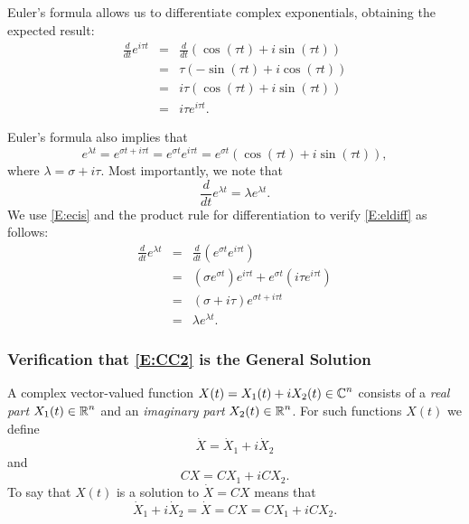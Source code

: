 \documentclass{ximera}
\begin{document}
Euler's formula allows us to differentiate
complex exponentials, obtaining the expected result:
\begin{eqnarray*}
\frac{d}{dt}e^{i\tau t} & = &
\frac{d}{dt}(\cos(\tau t) + i\sin(\tau t))\\
& = & \tau(-\sin(\tau t) + i\cos(\tau t)) \\
& = & i\tau(\cos(\tau t) + i\sin(\tau t))\\
& = & i\tau e^{i\tau t}.
\end{eqnarray*}

Euler's formula also implies that
\begin{equation}  \label{E:ecis}
e^{\lambda t} = e^{\sigma t + i\tau t} = e^{\sigma t}e^{i\tau t} =
e^{\sigma t}(\cos(\tau t) + i\sin(\tau t)),
\end{equation}
where $\lambda = \sigma+i\tau$.  Most importantly, we note that
\begin{equation}  \label{E:eldiff}
\frac{d}{dt}e^{\lambda t} = \lambda e^{\lambda t}.
\end{equation}
We use \eqref{E:ecis} and the product rule for differentiation to verify
\eqref{E:eldiff} as follows:
\begin{eqnarray*}
\frac{d}{dt}e^{\lambda t} & =  &
\frac{d}{dt}\left(e^{\sigma t}e^{i\tau t}\right)\\
& = & \left(\sigma e^{\sigma t}\right)e^{i\tau t}
+ e^{\sigma t}\left(i\tau e^{i\tau t}\right)\\
& = & (\sigma+i\tau)e^{\sigma t + i\tau t} \\
& = & \lambda e^{\lambda t}.
\end{eqnarray*}

\subsubsection*{Verification that \protect\eqref{E:CC2} is the General Solution}

A complex vector-valued function $X(t)=X_1(t)+iX_2(t)\in\mbox{$\mathbb{C}$}^n$
 consists of
a {\em real part\/} $X_1(t)\in\mbox{$\mathbb{R}$}^n$ and an {\em imaginary part\/}
$X_2(t)\in\mbox{$\mathbb{R}$}^n$.  For such functions $X(t)$ we define
\[
\dot{X} = \dot{X}_1+i\dot{X}_2
\]
and
\[
CX = CX_1 + iCX_2.
\]
To say that $X(t)$ is a solution to $\dot{X}=CX$ means that
\begin{equation}  \label{E:X1X2}
\dot{X}_1+i\dot{X}_2 = \dot{X} = CX = CX_1 + iCX_2.
\end{equation}
\end{document}
